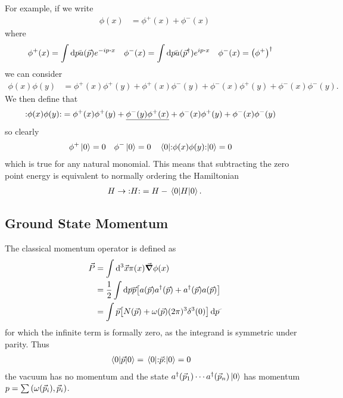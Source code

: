 \documentclass[notes.tex]{subfiles}
\begin{document}
For example, if we write 
\begin{align*}
    \phi(x) &= \phi^+(x) + \phi^-(x)
\end{align*}
where
\begin{align*}
    \phi^+(x) &= \int \dds{p} a(\vec{p})e^{-ip\vdot{x}}&
    \phi^-(x) &= \int \dds{p} a(\vec{p}^\dagger)e^{ip\vdot{x}}&
    \phi^-(x) &= \qty(\phi^+)^\dagger
\end{align*}
we can consider
\begin{align*}
    \phi(x)\phi(y) &= \phi^+(x)\phi^+(y) + \phi^+(x)\phi^-(y) + \phi^-(x)\phi^+(y) + \phi^-(x)\phi^-(y).
\end{align*}
We then define that
\begin{align*}
    \mathbf{:}\phi(x)\phi(y)\mathbf{:} &= \phi^+(x)\phi^+(y) + \underline{\phi^-(y)\phi^+(x)} + \phi^-(x)\phi^+(y) + \phi^-(x)\phi^-(y)
\end{align*}
so clearly
\begin{align*}
    \phi^+\ket{0} &= 0 & \phi^-\ket{0} &= 0 & \mel{0}{\mathbf{:}\phi(x)\phi(y)\mathbf{:}}{0} &= 0
\end{align*} 
which is true for any natural monomial.
This means that subtracting the zero point energy is equivalent to normally ordering the Hamiltonian
\begin{align*}
    H \to \mathbf{:}H\mathbf{:} = H - \mel{0}{H}{0}.
\end{align*}

\subsection{Ground State Momentum}
The classical momentum operator is defined as
\begin{align*}
    \vec{P} &= \int \dd[3]\vec{x} \pi(x)\grad{\phi}(x)\\
    &= \half\int\dds{p} \vec{p} \qty[a(\vec{p})a^\dagger(\vec{p}) + a^\dagger(\vec{p}) a(\vec{p})]\\
    &= \int \vec{p}\qty[N(\vec{p}) + \omega(\vec{p})(2\pi)^3 \delta^3(0)] \,\dds{p} 
\end{align*}
for which the infinite term is formally zero, as the integrand is symmetric under parity. 
Thus
\begin{align*}
    \mel{0}{\vec{p}}{0} &= \mel{0}{\mathbf{:}\vec{p}\mathbf{:}}{0} = 0
\end{align*}
\ie{}the vacuum has no momentum and the state $a^\dagger(\vec{p}_1)\cdots a^\dagger(\vec{p}_n)\ket{0}$ has momentum $p = \sum\qty(\omega(\vec{p}_i), \vec{p}_i)$.
\end{document}
